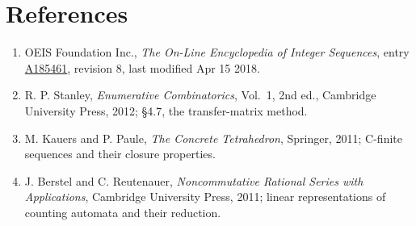 \documentclass[11pt]{article}
\theoremstyle{definition}
\begin{document}
\section{References}

\begin{enumerate}

\item OEIS Foundation Inc., \emph{The On-Line Encyclopedia of Integer Sequences}, entry \href{https://oeis.org/A185461}{A185461}, revision 8, last modified Apr 15 2018.

\item R. P. Stanley, \emph{Enumerative Combinatorics}, Vol.~1, 2nd ed., Cambridge University Press, 2012; \S4.7, the transfer-matrix method.

\item M. Kauers and P. Paule, \emph{The Concrete Tetrahedron}, Springer, 2011; C-finite sequences and their closure properties.

\item J. Berstel and C. Reutenauer, \emph{Noncommutative Rational Series with Applications}, Cambridge University Press, 2011; linear representations of counting automata and their reduction.

\end{enumerate}
\end{document}
